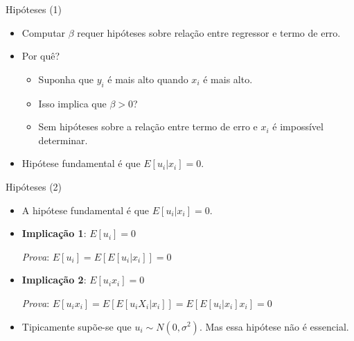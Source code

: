 \documentclass[10pt,slides,xcolor=pdftex,dvipsnames,table]{beamer}
\begin{document}

\begin{frame}{Hipóteses (1)}

\begin{itemize}\itemsep1.2em 
	
	\item Computar $\beta$ requer hipóteses sobre relação entre regressor e termo de erro.   
	
	\item Por quê?
	\begin{itemize}
	\item Suponha que $y_i$ é mais alto quando $x_i$ é mais alto.
	\item Isso implica que $\beta>0$?
	\item Sem hipóteses sobre a relação entre termo de erro e $x_i$ é impossível determinar. 
	\end{itemize}
	
	\item Hipótese fundamental é que $E[u_i | x_i] = 0$. 
        
\end{itemize}

\end{frame}


\begin{frame}{Hipóteses (2)}

\begin{itemize}\itemsep1.2em 
	
	\item A hipótese fundamental é que $E[u_i | x_i] = 0$.
            
	\item \textbf{Implicação 1}: $E[u_i]=0$
	
	\vspace{0.3cm}
	
	\textit{Prova}: $E[u_i] = E \left[ E[u_i | x_i ] \right] = 0$  
	
	\item \textbf{Implicação 2}: $E[u_i x_i]=0$

\vspace{0.3cm}
	
	\textit{Prova}: $E[u_i x_i] = E \left[ E[u_i X_i | x_i ] \right] = E \left[ E[u_i  | x_i ] x_i \right] = 0$  
	
	\item Tipicamente supõe-se que $u_i \sim N(0, \sigma^2)$. Mas essa hipótese não é essencial.      
        
\end{itemize}

\end{frame}
\end{document}
